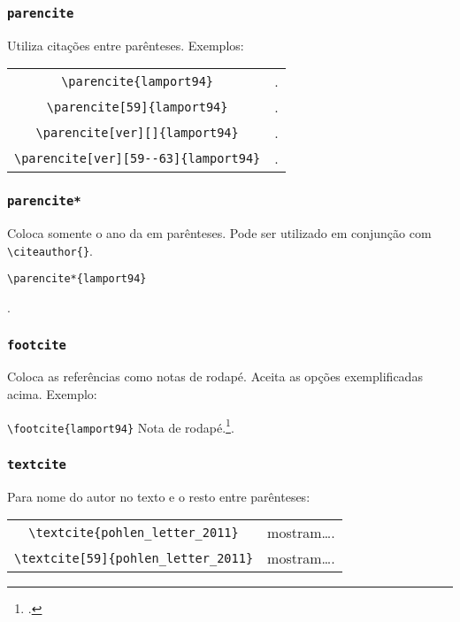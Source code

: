 \subsubsection*{\texttt{parencite}}
Utiliza citações entre parênteses. Exemplos:


\begin{tabular}{cc}
\centering
\verb+\parencite{lamport94}+ & \parencite{lamport94}.\\

\verb+\parencite[59]{lamport94}+ & \parencite[59]{lamport94}.\\

\verb+\parencite[ver][]{lamport94}+ &  \parencite[ver][]{lamport94}.\\

\verb+\parencite[ver][59--63]{lamport94}+ &  \parencite[ver][59--63]{lamport94}.\\
\end{tabular}

\subsubsection*{\texttt{parencite*}}
Coloca somente o ano da em parênteses. Pode ser utilizado em conjunção com \verb+\citeauthor{}+.

\begin{center}
\verb+\parencite*{lamport94}+\qquad

 \parencite*{lamport94}.
\end{center}

\subsubsection*{\texttt{footcite}}
Coloca as referências como notas de rodapé. Aceita as opções exemplificadas acima. Exemplo:


\begin{center}
\verb+\footcite{lamport94}+\qquad
 Nota de rodapé.\footcite{lamport94}.
\end{center}


\subsubsection*{\texttt{textcite}}
Para nome do autor no texto e o resto entre parênteses:

\begin{tabular}{cc}
\centering
\verb+\textcite{pohlen_letter_2011}+ & \textcite{pohlen_letter_2011} mostram\ldots .\\

\verb+\textcite[59]{pohlen_letter_2011}+ & \textcite[59]{pohlen_letter_2011} mostram\ldots .\\

\end{tabular}

